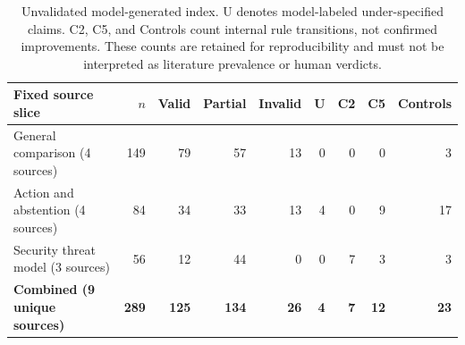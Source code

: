 \begin{table}[t]
\centering
\small
\setlength{\tabcolsep}{5pt}
\renewcommand{\arraystretch}{0.95}
\begin{tabular}{lrrrrrrrr}
\toprule
\textbf{Fixed source slice} & \textbf{$n$} & \textbf{Valid} & \textbf{Partial} & \textbf{Invalid} & \textbf{U} & \textbf{C2} & \textbf{C5} & \textbf{Controls} \\
\midrule
General comparison (4 sources) & 149 & 79 & 57 & 13 & 0 & 0 & 0 & 3 \\
Action and abstention (4 sources) & 84 & 34 & 33 & 13 & 4 & 0 & 9 & 17 \\
Security threat model (3 sources) & 56 & 12 & 44 & 0 & 0 & 7 & 3 & 3 \\
\midrule
\textbf{Combined (9 unique sources)} & \textbf{289} & \textbf{125} & \textbf{134} & \textbf{26} & \textbf{4} & \textbf{7} & \textbf{12} & \textbf{23} \\
\bottomrule
\end{tabular}
\caption{Unvalidated model-generated index. U denotes model-labeled
under-specified claims. C2, C5, and Controls count internal rule transitions,
not confirmed improvements. These counts are retained for reproducibility and
must not be interpreted as literature prevalence or human verdicts.}
\label{tab:main-observed-claim-audit}
\end{table}
